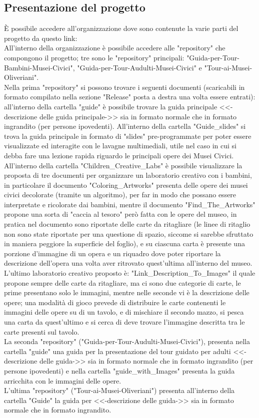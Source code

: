 \documentclass[hidelinks,12pt,a4paper]{article}
\begin{document}
\begin{flushleft}
				 \subsection{Presentazione del progetto}
				 È possibile accedere all'organizzazione dove sono contenute la varie parti del progetto da questo link:\\
				 All'interno della organizzazione è possibile accedere alle "repository" che compongono il progetto; tre sono le "repository" principali: "Guida-per-Tour-Bambini-Musei-Civici", "Guida-per-Tour-Audulti-Musei-Civici" e "Tour-ai-Musei-Oliveriani".\\
				 Nella prima "repository" si possono trovare i seguenti documenti (scaricabili in formato compilato nella sezione "Release" posta a destra una volta essere entrati): all'interno della cartella "guide" è possibile trovare la guida principale <<-descrizione delle guida principale->> sia in formato normale che in formato ingrandito (per persone ipovedenti). All'interno della cartella "Guide_slides" si trova la guida principale in formato di "slides" pre-programmate per poter essere visualizzate ed interagite con le lavagne multimediali, utile nel caso in cui si debba fare una lezione rapida riguardo le principali opere dei Musei Civici. All'interno della cartella "Children_Creative_Labs" è possibile visualizzare la proposta di tre documenti per organizzare un laboratorio creativo con i bambini, in particolare il documento "Coloring_Artworks" presenta delle opere dei musei civici decolorate (tramite un algoritmo), per far in modo che possano essere interpretate e ricolorate dai bambini, mentre il documento "Find_The_Artworks" propone una sorta di "caccia al tesoro" però fatta con le opere del museo, in pratica nel documento sono riportate delle carte da ritagliare (le linee di ritaglio non sono state riportate per una questione di spazio, siccome si sarebbe sfruttato in maniera peggiore la superficie del foglio), e su ciascuna carta è presente una porzione d'immagine di un opera e un riquadro dove poter riportare la descrizione dell'opera una volta aver ritrovato quest'ultima all'interno del museo. L'ultimo laboratorio creativo proposto è: "Link_Description_To_Images" il quale propone sempre delle carte da ritagliare, ma ci sono due categorie di carte, le prime presentano solo le immagini, mentre nelle seconde vi è la descrizione delle opere; una modalità di gioco prevede di distribuire le carte contenenti le immagini delle opere su di un tavolo, e di mischiare il secondo mazzo, si pesca una carta da quest'ultimo e si cerca di deve trovare l'immagine descritta tra le carte presenti sul tavolo.\\
				 La seconda "repository" ("Guida-per-Tour-Audulti-Musei-Civici"), presenta nella cartella "guide" una guida per la presentazione del tour guidato per adulti <<-descrizione delle guida->> sia in formato normale che in formato ingrandito (per persone ipovedenti) e nella cartella "guide_with_Images" presenta la guida arricchita con le immagini delle opere.\\
				 L'ultima "repository" ("Tour-ai-Musei-Oliveriani") presenta all'interno della cartella "Guide" la guida per <<-descrizione delle guida->>  sia in formato normale che in formato ingrandito.
				 

\end{flushleft}
\end{document}

